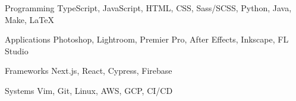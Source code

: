 

\begin{cvskills}

  \cvskill
    {Programming} %
    {TypeScript, JavaScript, HTML, CSS, Sass/SCSS, Python, Java, Make, \LaTeX} %

  \cvskill
    {Applications} %
    {Photoshop, Lightroom, Premier Pro, After Effects, Inkscape, FL Studio} %

  \cvskill
    {Frameworks} %
    {Next.js, React, Cypress, Firebase} %

  \cvskill
    {Systems} %
    {Vim, Git, Linux, AWS, GCP, CI/CD} %

\end{cvskills}
